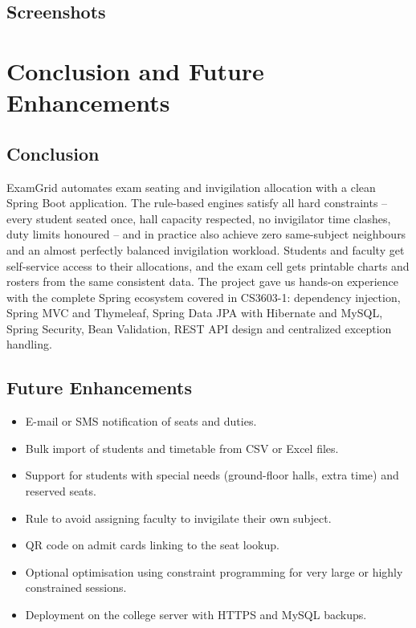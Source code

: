 \documentclass[12pt,a4paper,oneside]{report}
\begin{document}
\section{Screenshots}

\chapter{Conclusion and Future Enhancements}
\section{Conclusion}
ExamGrid automates exam seating and invigilation allocation with a clean Spring Boot application. The rule-based engines satisfy all hard constraints -- every student seated once, hall capacity respected, no invigilator time clashes, duty limits honoured -- and in practice also achieve zero same-subject neighbours and an almost perfectly balanced invigilation workload. Students and faculty get self-service access to their allocations, and the exam cell gets printable charts and rosters from the same consistent data. The project gave us hands-on experience with the complete Spring ecosystem covered in CS3603-1: dependency injection, Spring MVC and Thymeleaf, Spring Data JPA with Hibernate and MySQL, Spring Security, Bean Validation, REST API design and centralized exception handling.

\section{Future Enhancements}
\begin{itemize}
  \item E-mail or SMS notification of seats and duties.
  \item Bulk import of students and timetable from CSV or Excel files.
  \item Support for students with special needs (ground-floor halls, extra time) and reserved seats.
  \item Rule to avoid assigning faculty to invigilate their own subject.
  \item QR code on admit cards linking to the seat lookup.
  \item Optional optimisation using constraint programming for very large or highly constrained sessions.
  \item Deployment on the college server with HTTPS and MySQL backups.
\end{itemize}
\end{document}
